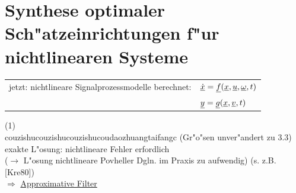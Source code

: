 \documentclass[openany,a4paper,11pt]{book}
\begin{document}
\section{Synthese optimaler Sch"atzeinrichtungen f"ur nichtlinearen Systeme}
\begin{tabular}{ll}
    jetzt: nichtlineare Signalprozessmodelle berechnet: & $\uline{\dot{x}}=\uline{f}(\uline{x},\uline{u},\uline{\omega},t)$\\
    & $\uline{y}=\uline{g}(\uline{x},\uline{v},t)$
\end{tabular} \quad (1)\\[3pt]
{\color{white} couzishucouzishucouzishucoudaozhuangtaifangc} (Gr"o"sen unver"andert zu 3.3)\\
exakte L"osung: nichtlineare Fehler erfordlich\\
($\rightarrow$ L"osung nichtlineare Povheller Dgln. im Praxis zu aufwendig) (s. z.B. [Kre80])\\
$\Rightarrow$ \uline{Approximative Filter}
\end{document}
